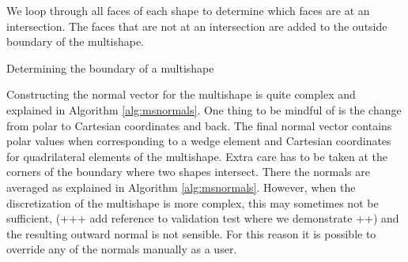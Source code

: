 \documentclass[11pt, a4paper]{article}
\theoremstyle{definition}
\begin{document}
\begin{algorithm}[H]
	\SetAlgoLined
	We loop through all faces of each shape to determine which faces are at an intersection. The faces that are not at an intersection are added to the outside boundary of the multishape. \\
	\caption{Determining the boundary of a multishape}
	\label{alg:msBoundary}
\end{algorithm}

Constructing the normal vector for the multishape is quite complex and explained in Algorithm \ref{alg:msnormals}. One thing to be mindful of is the change from polar to Cartesian coordinates and back. The final normal vector contains polar values when corresponding to a wedge element and Cartesian coordinates for quadrilateral elements of the multishape. Extra care has to be taken at the corners of the boundary where two shapes intersect. There the normals are averaged as explained in Algorithm \ref{alg:msnormals}. However, when the discretization of the multishape is more complex, this may sometimes not be sufficient, (+++ add reference to validation test where we demonstrate ++) and the resulting outward normal is not sensible. For this reason it is possible to override any of the normals manually as a user.
\end{document}

